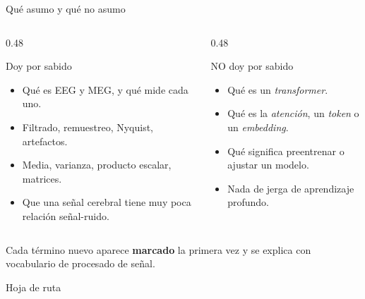 \documentclass[aspectratio=169,10pt]{beamer}
\newcommand{\term}[1]{\textbf{\color{deepgreen}#1}}
\newcommand{\eng}[1]{{\itshape\color{muted}#1}}
\begin{document}
\begin{frame}[c]{Qué asumo y qué no asumo}
  \begin{columns}[t,totalwidth=\linewidth]
    \begin{column}{0.48\linewidth}
      \begin{block}{Doy por sabido}
        \small
        \begin{itemize}
          \item Qué es EEG y MEG, y qué mide cada uno.
          \item Filtrado, remuestreo, Nyquist, artefactos.
          \item Media, varianza, producto escalar, matrices.
          \item Que una señal cerebral tiene muy poca relación señal-ruido.
        \end{itemize}
      \end{block}
    \end{column}
    \begin{column}{0.48\linewidth}
      \begin{alertblock}{NO doy por sabido}
        \small
        \begin{itemize}
          \item Qué es un \eng{transformer}.
          \item Qué es la \eng{atención}, un \eng{token} o un \eng{embedding}.
          \item Qué significa preentrenar o ajustar un modelo.
          \item Nada de jerga de aprendizaje profundo.
        \end{itemize}
      \end{alertblock}
    \end{column}
  \end{columns}
  \vspace{3mm}
  \centering\small
  Cada término nuevo aparece \term{marcado} la primera vez y se explica con vocabulario de procesado de señal.
\end{frame}

\begin{frame}[c]{Hoja de ruta}
  \footnotesize
  \tableofcontents
\end{frame}
\end{document}
